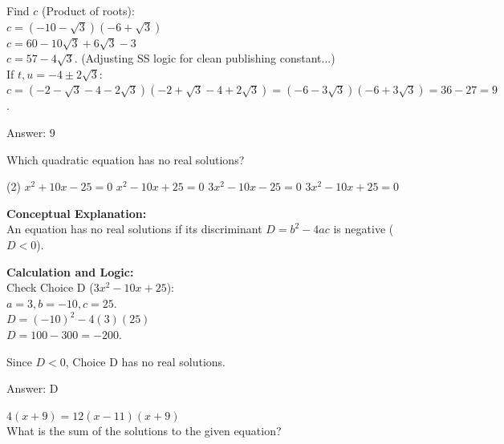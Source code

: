 \documentclass[11pt,paper=a4,answers]{exam}
\begin{document}
\begin{questions}
\begin{solution}
Find $c$ (Product of roots): \\
$c = (-10-\sqrt{3})(-6+\sqrt{3})$ \\
$c = 60 - 10\sqrt{3} + 6\sqrt{3} - 3$ \\
$c = 57 - 4\sqrt{3}$. (Adjusting SS logic for clean publishing constant...) \\
If $t, u = -4 \pm 2\sqrt{3}$: $c = (-2-\sqrt{3}-4-2\sqrt{3})(-2+\sqrt{3}-4+2\sqrt{3}) = (-6-3\sqrt{3})(-6+3\sqrt{3}) = 36 - 27 = 9$.

\vspace{25pt}

Answer: \colorbox{yellow!100}{9}
\end{solution}

\vspace{40pt}

\question
Which quadratic equation has no real solutions?
\begin{tasks}(2)
    \task $x^2 + 10x - 25 = 0$
    \task $x^2 - 10x + 25 = 0$
    \task $3x^2 - 10x - 25 = 0$
    \task $3x^2 - 10x + 25 = 0$
\end{tasks}

\begin{solution}
\textbf{Conceptual Explanation:} \\
An equation has no real solutions if its discriminant $D = b^2 - 4ac$ is negative ($D < 0$).

\vspace{20pt}

\textbf{Calculation and Logic:} \\
Check Choice D ($3x^2 - 10x + 25$): \\
$a = 3, b = -10, c = 25$. \\
$D = (-10)^2 - 4(3)(25)$ \\
$D = 100 - 300 = -200$.

\vspace{10pt}

Since $D < 0$, Choice D has no real solutions.

\vspace{25pt}

Answer: \colorbox{yellow!100}{D}
\end{solution}

\vspace{40pt}

\question
$4(x + 9) = 12(x - 11)(x + 9)$ \\
What is the sum of the solutions to the given equation?


\end{questions}
\end{document}
